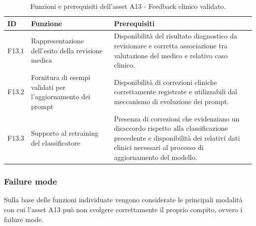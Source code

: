 \begin{table}[H]
    \centering
    \small
    \setlength{\tabcolsep}{4pt}
    \renewcommand{\arraystretch}{1.08}

    \begin{tabularx}{\textwidth}{
        >{\raggedright\arraybackslash}p{1.1cm}
        >{\raggedright\arraybackslash}p{3.8cm}
        X
    }
        \toprule

        \textbf{ID} &
        \textbf{Funzione} &
        \textbf{Prerequisiti} \\

        \midrule

        F13.1 &
        Rappresentazione dell'esito della revisione medica &
        Disponibilità del risultato diagnostico da revisionare e corretta
        associazione tra valutazione del medico e relativo caso clinico. \\

        \midrule

        F13.2 &
        Fornitura di esempi validati per l'aggiornamento dei prompt &
        Disponibilità di correzioni cliniche correttamente registrate e
        utilizzabili dal meccanismo di evoluzione dei prompt. \\

        \midrule

        F13.3 &
        Supporto al retraining del classificatore &
        Presenza di correzioni che evidenziano un disaccordo rispetto alla
        classificazione precedente e disponibilità dei relativi dati clinici
        necessari al processo di aggiornamento del modello. \\

        \bottomrule
    \end{tabularx}

    \caption{Funzioni e prerequisiti dell'asset A13 - Feedback clinico validato.}
    \label{tab:a13-functions}
\end{table}


\subsubsection{Failure mode}
Sulla base delle funzioni individuate vengono considerate le principali modalità con cui l'asset A13 può non svolgere correttamente il proprio compito, ovvero i failure mode.


